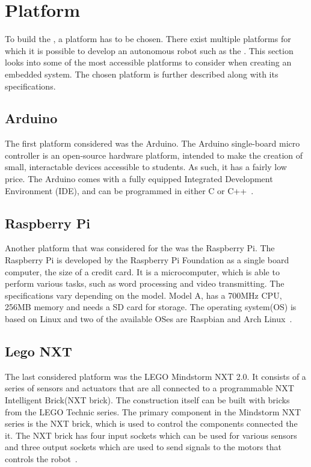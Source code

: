 \section{Platform} \label{sec:platform}
To build the \projname{}, a platform has to be chosen. There exist multiple platforms for which it is possible to develop an autonomous robot such as the \projname{}. This section looks into some of the most accessible platforms to consider when creating an embedded system. The chosen platform is further described along with its specifications.

\subsection{Arduino}
The first platform considered was the Arduino. The Arduino single-board micro controller is an open-source hardware platform, intended to make the creation of small, interactable devices accessible to students. As such, it has a fairly low price. The Arduino comes with a fully equipped Integrated Development Environment (IDE), and can be programmed in either C or C++~\citep{arduino}.

\subsection{Raspberry Pi}
Another platform that was considered for the \projname{} was the Raspberry Pi. The Raspberry Pi is developed by the Raspberry Pi Foundation as a single board computer, the size of a credit card. It is a microcomputer, which is able to perform various tasks, such as word processing and video transmitting. The specifications vary depending on the model. Model A, has a 700MHz CPU, 256MB memory and needs a SD card for storage. The operating system(OS) is based on Linux and two of the available OSes are Raspbian and Arch Linux~\citep{raspberry_pi}. 

\subsection{Lego NXT} \label{sec:lego_nxt}
The last considered platform was the LEGO Mindstorm NXT 2.0. It consists of a series of sensors and actuators that are all connected to a programmable NXT Intelligent Brick(NXT brick). The construction itself can be built with bricks from the LEGO Technic series. The primary component in the Mindstorm NXT series is the NXT brick, which is used to control the components connected the it. The NXT brick has four input sockets which can be used for various sensors and three output sockets which are used to send signals to the motors that controls the robot~\citep{lego_nxt_2.0}.

